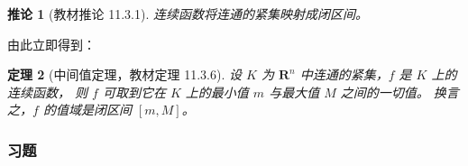 \documentclass[11pt]{ctexart}
\theoremstyle{plain}
\newtheorem{thm}{定理}[section]
\newtheorem{cor}[thm]{推论}
\theoremstyle{definition}
\theoremstyle{remark}
\begin{document}
\begin{cor}[教材推论 11.3.1]\label{cor:interval}
连续函数将连通的紧集映射成闭区间。
\end{cor}

由此立即得到：

\begin{thm}[中间值定理，教材定理 11.3.6]\label{thm:ivt}
设 \(K\) 为 \(\mathbf{R}^n\) 中连通的紧集，\(f\) 是 \(K\) 上的连续函数，
则 \(f\) 可取到它在 \(K\) 上的最小值 \(m\) 与最大值 \(M\) 之间的一切值。
换言之，\(f\) 的值域是闭区间 \([m,M]\)。
\end{thm}

\subsubsection{习题}
\end{document}
